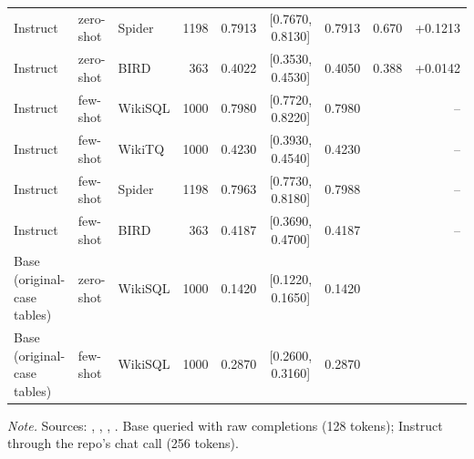 {\begin{longtable}{@{}lllrrcrrr@{}}
Instruct & zero-shot & Spider & 1198 & 0.7913 & [0.7670, 0.8130] & 0.7913 & 0.670 & +0.1213\\
Instruct & zero-shot & BIRD & 363 & 0.4022 & [0.3530, 0.4530] & 0.4050 & 0.388 & +0.0142\\
Instruct & few-shot & WikiSQL & 1000 & 0.7980 & [0.7720, 0.8220] & 0.7980 &  & --\\
Instruct & few-shot & WikiTQ & 1000 & 0.4230 & [0.3930, 0.4540] & 0.4230 &  & --\\
Instruct & few-shot & Spider & 1198 & 0.7963 & [0.7730, 0.8180] & 0.7988 &  & --\\
Instruct & few-shot & BIRD & 363 & 0.4187 & [0.3690, 0.4700] & 0.4187 &  & --\\
Base (original-case tables) & zero-shot & WikiSQL & 1000 & 0.1420 & [0.1220, 0.1650] & 0.1420 &  & \\
Base (original-case tables) & few-shot & WikiSQL & 1000 & 0.2870 & [0.2600, 0.3160] & 0.2870 &  & \\
\end{longtable}
}
\vspace{-0.6\baselineskip}
{\footnotesize\color{slate}\textit{Note.} Sources: , , , . Base queried with raw completions (128 tokens); Instruct through the repo's chat call (256 tokens).\par}
\medskip
